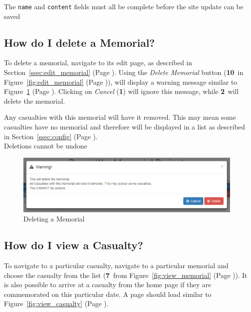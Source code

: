 \documentclass[12pt]{article}
\newcommand{\marker}[1]{\color{red}\textbf{#1}\color{black}}
\newcommand{\myref}[1]{\ref{#1} {\scriptsize(Page \pageref{#1})}}
\begin{document}
\begin{infoBox}
The \texttt{name} and \texttt{content} fields must all be complete before the site update can be saved
\end{infoBox}

\FloatBarrier
\subsection{How do I delete a Memorial?}\label{ssec:delete_memorial}
To delete a memorial, navigate to its edit page, as described in Section~\myref{ssec:edit_memorial}. Using the \textit{Delete Memorial} button (\marker{10}\ in Figure~\myref{fig:edit_memorial}), will display a warning message similar to Figure~\myref{fig:delete_memorial}. Clicking on \textit{Cancel} (\marker{1}) will ignore this message, while \marker{2}\ will delete the memorial.

\begin{warningBox}
Any casualties with this memorial will have it removed. This may mean some casualties have no memorial and therefore will be displayed in a list as described in Section~\myref{ssec:config}.\\
Deletions cannot be undone
\end{warningBox}

\begin{figure}[h]
  \centering
 \includegraphics[width=.9\textwidth]{pics/delete_memorial.png}
	\caption{Deleting a Memorial}\label{fig:delete_memorial}
\end{figure}

\newpage
\FloatBarrier
\subsection{How do I view a Casualty?}\label{ssec:view_casualty}
To navigate to a particular casualty, navigate to a particular memorial and choose the casualty from the list (\marker{7}\ from Figure~\myref{fig:view_memorial}). It is also possible to arrive at a casualty from the home page if they are commemorated on this particular date. A page should load similar to Figure~\myref{fig:view_casualty}.
\end{document}
